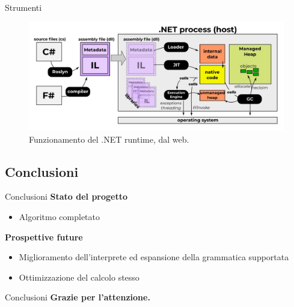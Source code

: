 \documentclass{beamer}
\begin{document}
\begin{darkframes}
    \begin{frame}{Strumenti}
        \begin{figure}[h]
            \caption{Funzionamento del .NET runtime, dal web.}
            \includegraphics[width=\textwidth]{../images/dotnet.png}
        \end{figure}
    \end{frame}

    \subsection{Conclusioni}
    \begin{frame}{Conclusioni}
        \textbf{Stato del progetto}
        \begin{itemize}
            \item Algoritmo completato
        \end{itemize}
        \textbf{Prospettive future}
        \begin{itemize}
            \item Miglioramento dell'interprete ed espansione della grammatica supportata
            \item Ottimizzazione del calcolo stesso
        \end{itemize}
    \end{frame}

    \begin{frame}{Conclusioni}
        \textbf{Grazie per l'attenzione.}
    \end{frame}

\end{darkframes}
\end{document}
